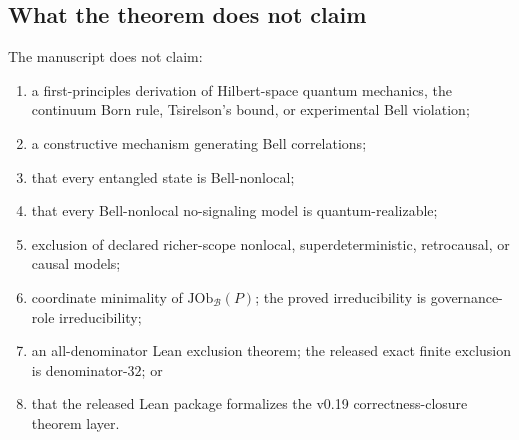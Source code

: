 \documentclass[11pt]{article}
\theoremstyle{definition}
\newcommand{\Bell}{\mathcal{B}}
\newcommand{\JOb}{\mathrm{JOb}_{\Bell}}
\begin{document}
\subsection{What the theorem does not claim}
The manuscript does not claim:
\begin{enumerate}[leftmargin=2em]
\item a first-principles derivation of Hilbert-space quantum mechanics, the continuum Born rule, Tsirelson's bound, or experimental Bell violation;
\item a constructive mechanism generating Bell correlations;
\item that every entangled state is Bell-nonlocal;
\item that every Bell-nonlocal no-signaling model is quantum-realizable;
\item exclusion of declared richer-scope nonlocal, superdeterministic, retrocausal, or causal models;
\item coordinate minimality of $\JOb(P)$; the proved irreducibility is governance-role irreducibility;
\item an all-denominator Lean exclusion theorem; the released exact finite exclusion is denominator-$32$; or
\item that the released Lean package formalizes the v0.19 correctness-closure theorem layer.
\end{enumerate}
\end{document}
